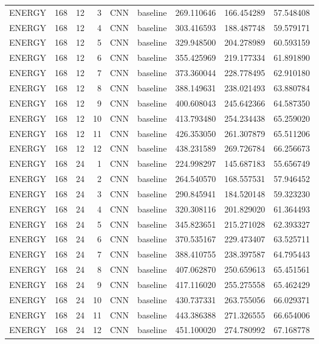 \begin{table}
\begin{tabular}{lrrrllrrr}
ENERGY & 168 & 12 & 3 & CNN & baseline & 269.110646 & 166.454289 & 57.548408 \\
ENERGY & 168 & 12 & 4 & CNN & baseline & 303.416593 & 188.487748 & 59.579171 \\
ENERGY & 168 & 12 & 5 & CNN & baseline & 329.948500 & 204.278989 & 60.593159 \\
ENERGY & 168 & 12 & 6 & CNN & baseline & 355.425969 & 219.177334 & 61.891890 \\
ENERGY & 168 & 12 & 7 & CNN & baseline & 373.360044 & 228.778495 & 62.910180 \\
ENERGY & 168 & 12 & 8 & CNN & baseline & 388.149631 & 238.021493 & 63.880784 \\
ENERGY & 168 & 12 & 9 & CNN & baseline & 400.608043 & 245.642366 & 64.587350 \\
ENERGY & 168 & 12 & 10 & CNN & baseline & 413.793480 & 254.234438 & 65.259020 \\
ENERGY & 168 & 12 & 11 & CNN & baseline & 426.353050 & 261.307879 & 65.511206 \\
ENERGY & 168 & 12 & 12 & CNN & baseline & 438.231589 & 269.726784 & 66.256673 \\
ENERGY & 168 & 24 & 1 & CNN & baseline & 224.998297 & 145.687183 & 55.656749 \\
ENERGY & 168 & 24 & 2 & CNN & baseline & 264.540570 & 168.557531 & 57.946452 \\
ENERGY & 168 & 24 & 3 & CNN & baseline & 290.845941 & 184.520148 & 59.323230 \\
ENERGY & 168 & 24 & 4 & CNN & baseline & 320.308116 & 201.829020 & 61.364493 \\
ENERGY & 168 & 24 & 5 & CNN & baseline & 345.823651 & 215.271028 & 62.393327 \\
ENERGY & 168 & 24 & 6 & CNN & baseline & 370.535167 & 229.473407 & 63.525711 \\
ENERGY & 168 & 24 & 7 & CNN & baseline & 388.410755 & 238.397587 & 64.795443 \\
ENERGY & 168 & 24 & 8 & CNN & baseline & 407.062870 & 250.659613 & 65.451561 \\
ENERGY & 168 & 24 & 9 & CNN & baseline & 417.116020 & 255.275558 & 65.462429 \\
ENERGY & 168 & 24 & 10 & CNN & baseline & 430.737331 & 263.755056 & 66.029371 \\
ENERGY & 168 & 24 & 11 & CNN & baseline & 443.386388 & 271.326555 & 66.654006 \\
ENERGY & 168 & 24 & 12 & CNN & baseline & 451.100020 & 274.780992 & 67.168778 \\

\end{tabular}
\end{table}
